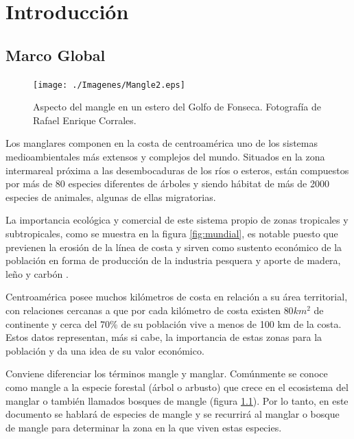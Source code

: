 


\chapter{Introducción}\label{cap:introduccion}

\section{Marco Global}

\begin{figure}
	\centering
	\texttt{[image: ./Imagenes/Mangle2.eps]}
	\caption[Mangle en el Golfo de Fonseca]{Aspecto del mangle en un estero del Golfo de Fonseca. Fotografía de Rafael Enrique Corrales.}
	\label{fig:mangle}
\end{figure}

Los manglares componen en la costa de centroamérica uno de los sistemas medioambientales más extensos y complejos del mundo. Situados en la zona intermareal próxima a las desembocaduras de los ríos o esteros, están compuestos por más de 80 especies diferentes de árboles y siendo hábitat de más de 2000 especies de animales, algunas de ellas migratorias.%

La importancia ecológica y comercial de este sistema propio de zonas tropicales y subtropicales, como se muestra en la figura \ref{fig:mundial}, es notable puesto que previenen la erosión de la línea de costa y sirven como sustento económico de la población en forma de producción de la industria pesquera y aporte de madera, leño y carbón \citep{Lara1999}.%

Centroamérica posee muchos kilómetros de costa en relación a su área territorial, con relaciones cercanas a que por cada kilómetro de costa existen $80km^{2}$ de continente y cerca del 70\% de su población vive a menos de 100 km de la costa. Estos datos representan, más si cabe, la importancia de estas zonas para la población y da una idea de su valor económico.%

Conviene diferenciar los términos mangle y manglar. Comúnmente se conoce como mangle a la especie forestal (árbol o arbusto) que crece en el ecosistema del manglar o también llamados bosques de mangle (figura \ref{fig:mangle}). Por lo tanto, en este documento se hablará de especies de mangle y se recurrirá al manglar o bosque de mangle para determinar la zona en la que viven estas especies.%

